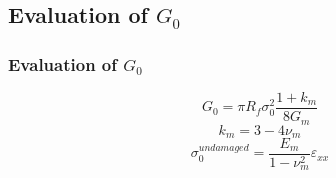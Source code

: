 \documentclass[first,firstsupp,lastsupp,handout,last,hyperref,table]{ETHclass}
\begin{document}
\subsection{Evaluation of $G_{0}$}
\begin{frame}
\frametitle{\small Evaluation of $G_{0}$}
\vspace{-0.7cm}
\footnotesize
\centering
\captionsetup[figure]{font=scriptsize,labelfont=scriptsize}
\begin{equation}
G_{0}=\pi R_{f}\sigma^{2}_{0}\frac{1+k_{m}}{8G_{m}}
\end{equation}
\begin{equation}
k_{m}=3-4\nu_{m}
\end{equation}
\begin{equation}
\sigma_{0}^{undamaged}=\frac{E_{m}}{1-\nu^{2}_{m}}\varepsilon_{xx}
\end{equation}%
\end{frame}
\end{document}
